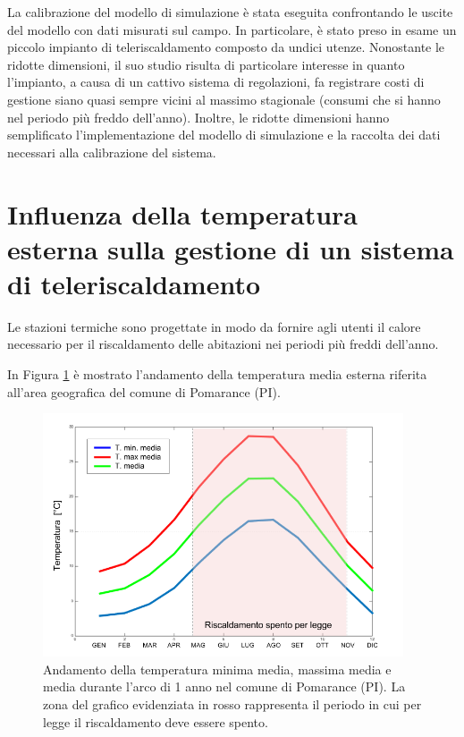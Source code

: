 \documentclass[laurea,oneside,11pt]{USiena_tesiLM}
\begin{document}
La calibrazione del modello di simulazione è stata eseguita confrontando le uscite del modello con dati misurati sul campo.
In particolare, è stato preso in esame un piccolo impianto di teleriscaldamento composto da undici utenze. Nonostante le ridotte dimensioni, il suo studio risulta di particolare interesse in quanto l'impianto, a causa di un cattivo sistema di regolazioni, fa registrare costi di gestione siano quasi sempre vicini al massimo stagionale (consumi che si hanno nel periodo più freddo dell'anno). Inoltre, le ridotte dimensioni  hanno semplificato l'implementazione del modello di simulazione e la raccolta dei dati necessari alla calibrazione del sistema.  

\section{Influenza della temperatura esterna sulla gestione di un sistema di teleriscaldamento}
Le stazioni termiche sono progettate in modo da fornire agli utenti il calore necessario per il riscaldamento delle abitazioni nei periodi più freddi dell'anno.

In Figura \ref{fig:profilo_temp} è mostrato l'andamento della temperatura media esterna riferita all'area geografica del comune di Pomarance (PI).

\begin{figure}[!ht]
\centering
\includegraphics[width=0.95\textwidth]{figure/profilo_temp} 
\caption{Andamento della temperatura minima media, massima media e media durante l'arco di 1 anno nel comune di Pomarance (PI). La zona del grafico evidenziata in rosso rappresenta il periodo in cui per legge il riscaldamento deve essere spento. }
\label{fig:profilo_temp}
\end{figure}
\end{document}
